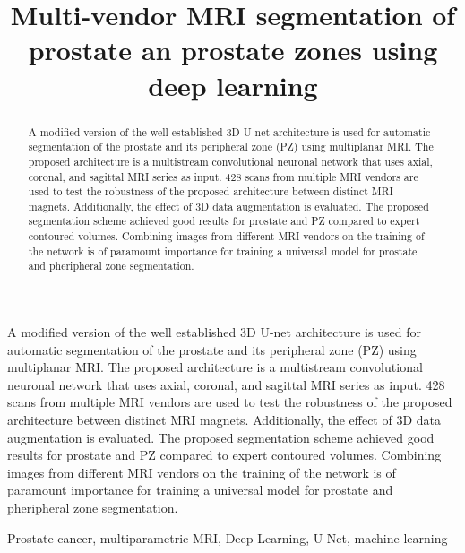 \documentclass{article}
\title{Multi-vendor MRI segmentation 
of prostate an prostate zones using deep learning}
\begin{document}
\maketitle

\begin{abstract}
A modified version of the well established 3D U-net architecture is used
for automatic segmentation of the prostate and its peripheral zone (PZ) using
multiplanar MRI. The proposed architecture is a multistream convolutional
neuronal network that uses axial, coronal, and sagittal MRI series as input. 
428 scans from multiple MRI vendors are used to test the robustness 
of the proposed architecture between distinct MRI magnets. Additionally, the 
effect of 3D data augmentation  is evaluated.
The proposed segmentation scheme achieved good results for prostate and PZ compared to expert
contoured volumes. Combining images from different MRI vendors on the training of 
the network is of paramount importance for training a universal model for
prostate and pheripheral zone segmentation. 
\end{abstract}
A modified version of the well established 3D U-net architecture is used for automatic segmentation of the prostate and its peripheral zone (PZ) using multiplanar MRI. The proposed architecture is a multistream convolutional neuronal network that uses axial, coronal, and sagittal MRI series as input.  428 scans from multiple MRI vendors are used to test the robustness of the proposed architecture between distinct MRI magnets. Additionally, the effect of 3D data augmentation  is evaluated.  The proposed segmentation scheme achieved good results for prostate and PZ compared to expert contoured volumes. Combining images from different MRI vendors on the training of the network is of paramount importance for training a universal model for prostate and pheripheral zone segmentation. 


\begin{keywords}
Prostate cancer, multiparametric MRI, Deep Learning, U-Net, machine learning
\end{keywords}








\end{document}
